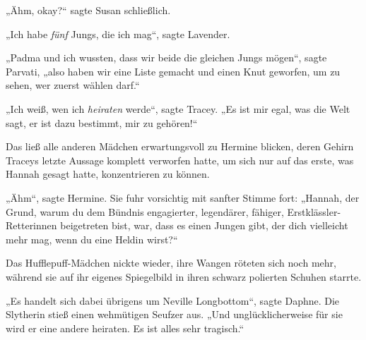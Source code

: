 „Ähm, okay?“ sagte Susan schließlich.

„Ich habe \emph{fünf} Jungs, die ich mag“, sagte Lavender.

„Padma und ich wussten, dass wir beide die gleichen Jungs mögen“, sagte Parvati, „also haben wir eine Liste gemacht und einen Knut geworfen, um zu sehen, wer zuerst wählen darf.“

„Ich weiß, wen ich \emph{heiraten} werde“, sagte Tracey.
„Es ist mir egal, was die Welt sagt, er ist dazu bestimmt, mir zu gehören!“

Das ließ alle anderen Mädchen erwartungsvoll zu Hermine blicken, deren Gehirn Traceys letzte Aussage komplett verworfen hatte, um sich nur auf das erste, was Hannah gesagt hatte, konzentrieren zu können.

„Ähm“, sagte Hermine. Sie fuhr vorsichtig mit sanfter Stimme fort:
„Hannah, der Grund, warum du dem Bündnis engagierter, legendärer, fähiger, Erstklässler-Retterinnen beigetreten bist, war, dass es einen Jungen gibt, der dich vielleicht mehr mag, wenn du eine Heldin wirst?“

Das Hufflepuff-Mädchen nickte wieder, ihre Wangen röteten sich noch mehr, während sie auf ihr eigenes Spiegelbild in ihren schwarz polierten Schuhen starrte.

„Es handelt sich dabei übrigens um Neville Longbottom“, sagte Daphne. Die Slytherin stieß einen wehmütigen Seufzer aus.
„Und unglücklicherweise für sie wird er eine andere heiraten. Es ist alles sehr tragisch.“

